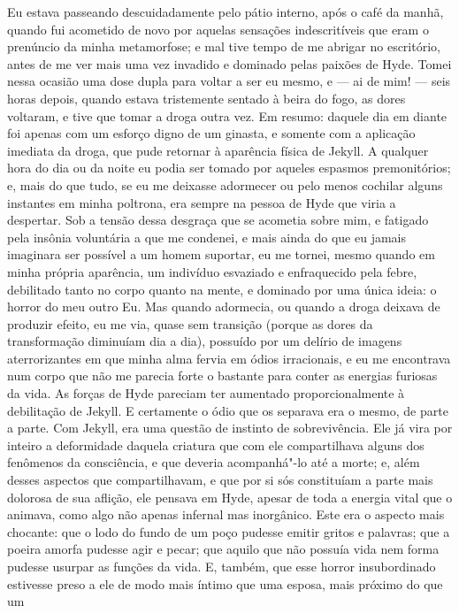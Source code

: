 Eu estava passeando descuidadamente pelo pátio interno, após o café da
manhã, quando fui acometido de novo por aquelas sensações
indescritíveis que eram o prenúncio da minha metamorfose; e mal tive
tempo de me abrigar no escritório, antes de me ver mais uma vez
invadido e dominado pelas paixões de Hyde.  Tomei nessa ocasião uma
dose dupla para voltar a ser eu mesmo, e --- ai de mim! --- seis horas
depois, quando estava tristemente sentado à beira do fogo, as dores
voltaram, e tive que tomar a droga outra vez.  Em resumo: daquele dia
em diante foi apenas com um esforço digno de um ginasta, e somente com
a aplicação imediata da droga, que pude retornar à aparência física de
Jekyll.  A qualquer hora do dia ou da noite eu podia ser tomado por
aqueles espasmos premonitórios; e, mais do que tudo, se eu me deixasse
adormecer ou pelo menos cochilar alguns instantes em minha poltrona,
era sempre na pessoa de Hyde que viria a despertar.  Sob a tensão dessa
desgraça que se acometia sobre mim, e fatigado pela insônia voluntária
a que me condenei, e mais ainda do que eu jamais imaginara ser possível
a um homem suportar, eu me tornei, mesmo quando em minha própria
aparência, um indivíduo esvaziado e enfraquecido pela febre, debilitado
tanto no corpo quanto na mente, e dominado por uma única ideia: o
horror do meu outro Eu.  Mas quando adormecia, ou quando a droga
deixava de produzir efeito, eu me via, quase sem transição (porque as
dores da transformação diminuíam dia a dia), possuído por um delírio de
imagens aterrorizantes em que minha alma fervia em ódios irracionais, e
eu me encontrava num corpo que não me parecia forte o bastante para
conter as energias furiosas da vida.  As forças de Hyde pareciam ter
aumentado proporcionalmente à debilitação de Jekyll.  E certamente o
ódio que os separava era o mesmo, de parte a parte.  Com Jekyll, era
uma questão de instinto de sobrevivência.  Ele já vira por inteiro a
deformidade daquela criatura que com ele compartilhava alguns dos
fenômenos da consciência, e que deveria acompanhá"-lo até a morte; e,
além desses aspectos que compartilhavam, e que por si sós constituíam a
parte mais dolorosa de sua aflição, ele pensava em Hyde, apesar de toda
a energia vital que o animava, como algo não apenas infernal mas
inorgânico.  Este era o aspecto mais chocante: que o lodo do fundo de
um poço pudesse emitir gritos e palavras; que a poeira amorfa pudesse
agir e pecar; que aquilo que não possuía vida nem forma pudesse usurpar
as funções da vida.  E, também, que esse horror insubordinado estivesse
preso a ele de modo mais íntimo que uma esposa, mais próximo do que um
